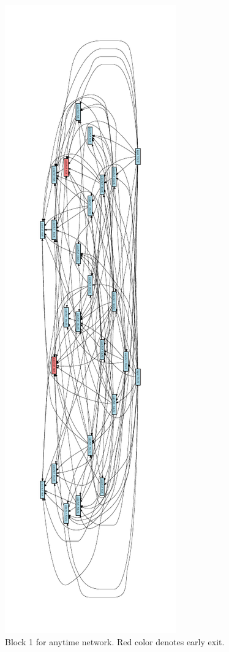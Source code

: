 \begin{figure}[h]
\else
\begin{center}
\includegraphics[width=0.4\linewidth]{figures/graph_642261663860860599_cell_0.pdf}
\end{center}
\fi
\caption{Block 1 for anytime network. Red color denotes early exit.}
\label{fig:best_anytime1}
\end{figure}


